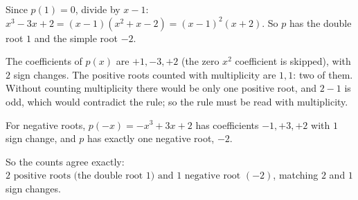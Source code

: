 Since $p(1)=0$, divide by $x-1$: $x^3-3x+2=(x-1)(x^2+x-2)=(x-1)^2(x+2)$. So $p$ has the double root $1$ and the simple root $-2$.

The coefficients of $p(x)$ are $+1,-3,+2$ (the zero $x^2$ coefficient is skipped), with $2$ sign changes. The positive roots counted with multiplicity are $1,1$: two of them. Without counting multiplicity there would be only one positive root, and $2-1$ is odd, which would contradict the rule; so the rule must be read with multiplicity.

For negative roots, $p(-x)=-x^3+3x+2$ has coefficients $-1,+3,+2$ with $1$ sign change, and $p$ has exactly one negative root, $-2$.

So the counts agree exactly: $\boxed{2\text{ positive roots (the double root }1)\text{ and }1\text{ negative root }(-2)}$, matching $2$ and $1$ sign changes.
